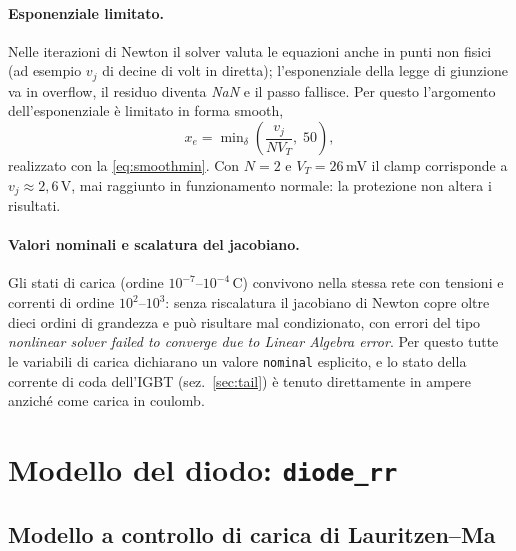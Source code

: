 \documentclass[11pt,a4paper]{article}
\newcommand{\ssc}[1]{\texttt{#1}}
\begin{document}
\paragraph{Esponenziale limitato.}
Nelle iterazioni di Newton il solver valuta le equazioni anche in punti
non fisici (ad esempio $v_j$ di decine di volt in diretta); l'esponenziale
della legge di giunzione va in overflow, il residuo diventa \emph{NaN} e
il passo fallisce. Per questo l'argomento dell'esponenziale \`e limitato
in forma smooth,
\begin{equation}
x_e = \min\nolimits_\delta\!\left(\frac{v_j}{N V_T},\; 50\right),
\end{equation}
realizzato con la \eqref{eq:smoothmin}. Con $N=2$ e $V_T = 26\,$mV il
clamp corrisponde a $v_j \approx 2{,}6\,$V, mai raggiunto in
funzionamento normale: la protezione non altera i risultati.

\paragraph{Valori nominali e scalatura del jacobiano.}
Gli stati di carica (ordine $10^{-7}$--$10^{-4}\,$C) convivono nella
stessa rete con tensioni e correnti di ordine $10^{2}$--$10^{3}$: senza
riscalatura il jacobiano di Newton copre oltre dieci ordini di
grandezza e pu\`o risultare mal condizionato, con errori del tipo
\emph{nonlinear solver failed to converge due to Linear Algebra error}.
Per questo tutte le variabili di carica dichiarano un valore
\ssc{nominal} esplicito, e lo stato della corrente di coda dell'IGBT
(sez.~\ref{sec:tail}) \`e tenuto direttamente in ampere anzich\'e come
carica in coulomb.

\section{Modello del diodo: \ssc{diode\_rr}}

\subsection{Modello a controllo di carica di Lauritzen--Ma}
\end{document}
